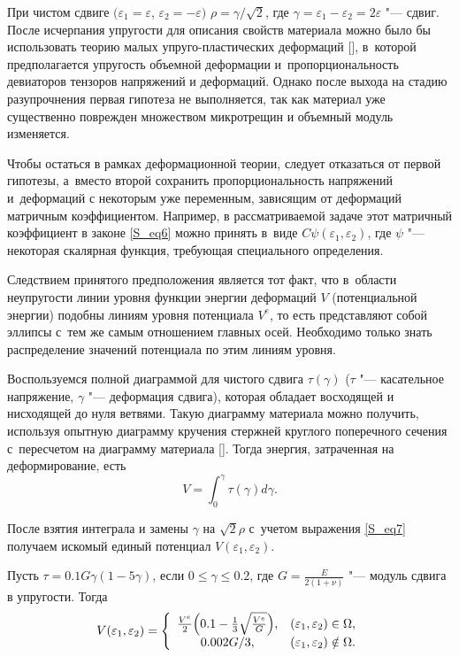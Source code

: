При чистом сдвиге $ (\varepsilon_1 = \varepsilon$, $\varepsilon_2 = - \varepsilon)$  $\rho = \gamma /\sqrt{2}$, где    $ \gamma = \varepsilon_1 - \varepsilon_2 = 2 \varepsilon $ "--- сдвиг.
После исчерпания упругости для описания свойств материала можно было бы использовать теорию малых упруго-пластических деформаций [], в~которой предполагается упругость объемной деформации и~пропорциональность девиаторов тензоров напряжений и деформаций. 
Однако после выхода на стадию разупрочнения первая гипотеза не выполняется, так как материал уже существенно поврежден множеством микротрещин и объемный модуль изменяется. 

Чтобы остаться в рамках деформационной теории, следует отказаться от первой гипотезы, а~вместо второй сохранить пропорциональность напряжений и~деформаций с некоторым уже переменным, зависящим от деформаций матричным коэффициентом. 
Например, в рассматриваемой задаче %
этот матричный коэффициент в законе \eqref{S_eq6} можно принять в~виде $ C \psi(\varepsilon_1,\varepsilon_2)$, 
где $ \psi $ "--- некоторая скалярная функция, требующая специального определения.

Следствием принятого предположения является тот факт, что в~области неупругости линии уровня функции энергии деформаций $ V $ (потенциальной энергии) подобны линиям уровня потенциала $ V^{e} $, то есть представляют собой эллипсы с~тем же самым отношением главных осей. 
Необходимо только знать распределение значений потенциала по  этим линиям уровня.

Воспользуемся полной диаграммой для чистого сдвига $ \tau(\gamma) $ ($ \tau $ "--- касательное напряжение, $ \gamma $ "--- деформация сдвига), которая обладает восходящей и нисходящей до нуля ветвями. 
Такую диаграмму материала можно получить, используя опытную диаграмму кручения стержней  круглого поперечного сечения с~пересчетом на диаграмму материала []. 
Тогда энергия, затраченная на деформирование, есть   
$$ V = \int ^{\gamma}_{0}\tau(\gamma)  d\gamma .$$

После взятия интеграла и замены $ \gamma $ на $ \sqrt{2} \rho $  с~учетом выражения \eqref{S_eq7} получаем искомый единый потенциал $ V(\varepsilon_1,\varepsilon_2) $. 

Пусть $ \tau = 0.1G   \gamma(1-5 \gamma)$, если $ 0 \le \gamma \le 0.2 $, где  
$ G = \frac{E}{2(1+\nu)} $ "---  модуль сдвига в упругости. 
Тогда
\begin{equation}\label{S_eq8}
V(\varepsilon_1,\varepsilon_2) = 
\left\lbrace  
\begin{array}{cl}
\frac{V^{e}}{2}\Bigl( 0.1 - \frac{1}{3}\sqrt{\frac{V^{e}}{G}}\Bigr), & (\varepsilon_1,\varepsilon_2) \in \Omega , \\
0.002 G/3 , & (\varepsilon_1,\varepsilon_2) \notin \Omega.
\end{array}
\right. 
\end{equation}


